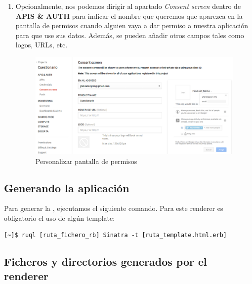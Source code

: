 \begin{enumerate}
  \item Opcionalmente, nos podemos dirigir al apartado \textit{Consent screen} dentro de {\bfseries APIS \& AUTH} para indicar el nombre que queremos que aparezca
  en la pantalla de permisos cuando alguien vaya a dar permiso a nuestra aplicaci\'on para que use sus datos. Adem\'as, se pueden a\~{n}adir otros campos tales como
  logos, URLs, etc.
  \begin{figure}[!th]
  \begin{center}
  \includegraphics[width=1.2\textwidth]{images/gdc6.eps}
  \caption{Personalizar pantalla de permisos}
  \label{fig:gdc6}
  \end{center}
  \end{figure}
  
\end{enumerate}
\newpage

\subsection{Generando la aplicaci\'on}
\label{subsec:Apendice2.14}

Para generar la , ejecutamos el siguiente comando. Para este renderer es obligatorio el uso de alg\'un template:
\begin{verbatim}
[~]$ ruql [ruta_fichero_rb] Sinatra -t [ruta_template.html.erb]
\end{verbatim}

\subsection{Ficheros y directorios generados por el renderer}
\label{subsec:Apendice2.15}

